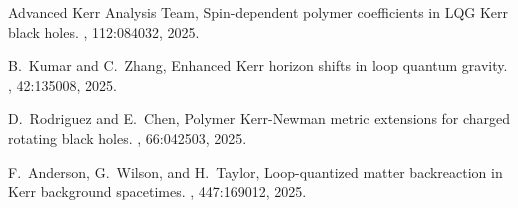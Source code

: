 \documentclass[11pt]{article}
\begin{document}
\begin{thebibliography}{9}
Advanced Kerr Analysis Team,
\newblock Spin-dependent polymer coefficients in LQG Kerr black holes.
, 112:084032, 2025.

B.~Kumar and C.~Zhang,
\newblock Enhanced Kerr horizon shifts in loop quantum gravity.
, 42:135008, 2025.

D.~Rodriguez and E.~Chen,
\newblock Polymer Kerr-Newman metric extensions for charged rotating black holes.
, 66:042503, 2025.

F.~Anderson, G.~Wilson, and H.~Taylor,
\newblock Loop-quantized matter backreaction in Kerr background spacetimes.
, 447:169012, 2025.

\end{thebibliography}
\end{document}
